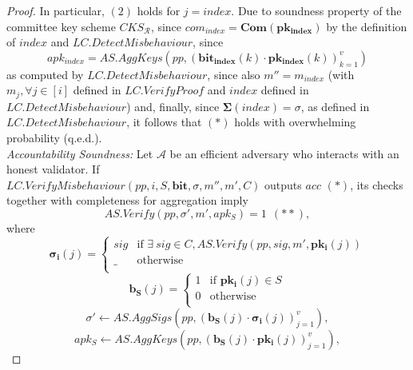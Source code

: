 \begin{proof}
\noindent In particular, $(2)$ holds for $j = \mathit{index}$. Due to soundness property of the committee key scheme $\mathit{CKS_{\mathcal{R}}}$, 
since $\mathit{com_{\mathit{index}}} = \mathbf{Com}(\mathbf{pk_{\mathbf{index}}})$ by the definition of $\mathit{index}$ and 
$\mathit{LC.DetectMisbehaviour}$, since $$\mathit{apk_{\mathit{index}}} = \mathit{AS.AggKeys}(\mathit{pp}, 
(\mathbf{bit_{\mathbf{index}}}(k) \cdot \mathbf{pk_{\mathbf{index}}}(k))_{k=1}^v)$$ as computed by $\mathit{LC.DetectMisbehaviour}$, 
since also $m'' = m_{\mathit{index}}$ (with $m_j, \forall j \in [i]$ defined in $\mathit{LC.VerifyProof}$ and $\mathit{index}$ defined 
in $\mathit{LC.DetectMisbehaviour}$) and, finally, since $\mathbf{\Sigma}(\mathit{index}) = \sigma$, as defined in $\mathit{LC.DetectMisbehaviour}$, 
it follows that $(*)$ holds with overwhelming probability (q.e.d.). \\
 
\noindent \textit{Accountability Soundness:} Let $\mathcal{A}$ be an efficient adversary who interacts with an honest validator. If \\ $\mathit{LC.VerifyMisbehaviour}(\mathit{pp}, i, S, \mathbf{bit}, \sigma, m'', m', C)$ 
outputs $\mathit{acc}$ $(\ast)$, its checks together with completeness for aggregation imply 
$$\mathit{AS.Verify}(\mathit{pp}, \sigma', m', \mathit{apk_S}) = 1 \ \ (\ast\ast),$$
where 
\begin{equation*}
  \mathbf{\sigma_i}(j) =
    \begin{cases}
      \mathit{sig} & \text{if }  \exists \ \mathit{sig} \in C, \mathit{AS.Verify}(\mathit{pp}, \mathit{sig}, m', \mathbf{pk_i}(j)) \\
      \_ & \text{otherwise} \\
    \end{cases}       
\end{equation*}
\begin{equation*}
  \mathbf{b_{S}}(j) =
    \begin{cases}
      1 & \text{if }  \mathbf{pk_i}(j) \in S \\
      0 & \text{otherwise} \\
    \end{cases}       
\end{equation*}
$$ \sigma' \leftarrow  \mathit{AS.AggSigs}(\mathit{pp}, (\mathbf{b_{S}}(j) \cdot \mathbf{\sigma_i}(j))_{j=1}^v),$$
$$\mathit{apk_S} \leftarrow \mathit{AS.AggKeys}(\mathit{pp},(\mathbf{b_{S}}(j) \cdot \mathbf{pk_i}(j))_{j=1}^v),$$


\end{proof}
